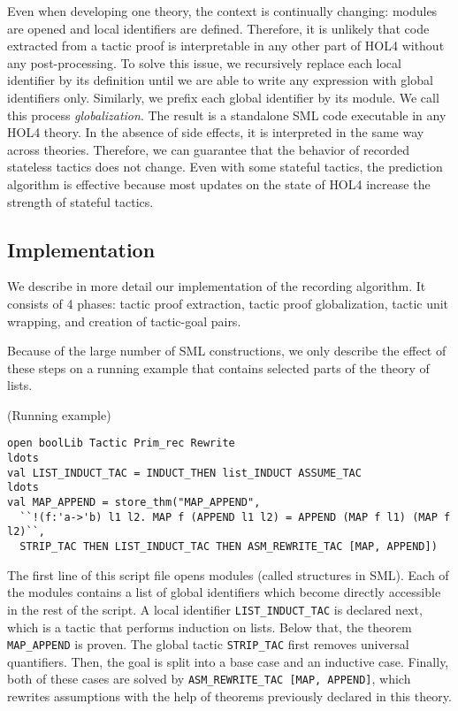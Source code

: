 \documentclass[runningheads,a4paper,draft]{svjour3}
\def\holfour{\textsf{HOL4}\xspace}
\def\sml{\textsf{SML}\xspace}
\begin{document}
Even when developing one theory, the context is continually changing:
modules are opened and local identifiers are defined. Therefore, it is unlikely
that code extracted from a tactic proof is interpretable in any other part of
\holfour without any post-processing.
To solve this issue, we recursively replace each local identifier by its
definition until we are able to write any expression with global identifiers
only. Similarly, we prefix each global identifier by its module.
We call this process \emph{globalization}. The result is a standalone \sml code
executable in any \holfour theory.  In the absence of side effects, it is
interpreted in the same way across theories.
Therefore, we can guarantee that the behavior of recorded stateless tactics
does not change. Even with some stateful tactics, the prediction algorithm is
effective because most updates on the state of \holfour increase the
strength of stateful tactics.

\subsection{Implementation}
We describe in more detail our implementation of the recording algorithm. It
consists of 4 phases: tactic proof extraction, tactic proof globalization,
tactic unit wrapping, and creation of tactic-goal pairs.

Because of the large number of \sml constructions, we only describe the effect
of these steps on a running example that contains selected parts of the theory
of lists.


\begin{example}\label{ex:running}(Running example)
\small
\begin{lstlisting}[language=SMLSmall]
open boolLib Tactic Prim_rec Rewrite
ldots
val LIST_INDUCT_TAC = INDUCT_THEN list_INDUCT ASSUME_TAC
ldots
val MAP_APPEND = store_thm("MAP_APPEND",
  ``!(f:'a->'b) l1 l2. MAP f (APPEND l1 l2) = APPEND (MAP f l1) (MAP f l2)``,
  STRIP_TAC THEN LIST_INDUCT_TAC THEN ASM_REWRITE_TAC [MAP, APPEND])
\end{lstlisting}
\end{example}

The first line of this script file opens modules (called structures in \sml).
Each of
the modules contains a list of global identifiers which become directly
accessible in
the rest of the script.
A local identifier \texttt{LIST\_INDUCT\_TAC} is declared next, which is a
tactic that performs induction on lists. Below that, the theorem
\texttt{MAP\_APPEND} is proven.
The global tactic \texttt{STRIP\_TAC} first removes universal quantifiers. Then,
the goal is split into a base case and an inductive case. Finally, both
of these cases are solved by \texttt{ASM\_REWRITE\_TAC [MAP, APPEND]}, which
rewrites assumptions with the help of theorems previously declared in this
theory.
\end{document}
